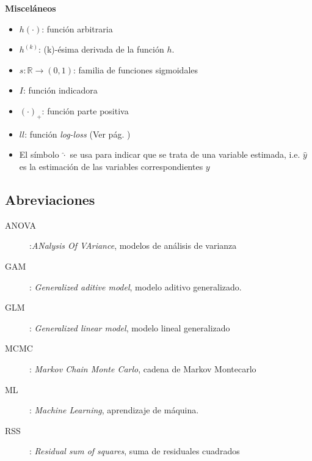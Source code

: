 \documentclass[../../Main/Main.tex]{subfiles}
\begin{document}
\textbf{Misceláneos}
\begin{itemize}[label={}]
	\item $h(\cdot)$: función arbitraria
	\item $h^{(k)}$: (k)-ésima derivada de la función $h$.
	\item $s: \mathbb{R} \rightarrow (0,1)$: familia de funciones sigmoidales
	\item $I$: función indicadora
	\item $(\cdot)_{+}$: función parte positiva
	\item $ll$: función \textit{log-loss} (Ver pág. \pageref{ec:LogLoss})
	\item El símbolo $\hat{\cdot}$ se usa para indicar que se trata de una variable estimada, i.e. $\hat{y}$ es la estimación de las variables correspondientes $y$
\end{itemize}

\subsection*{Abreviaciones}
\begin{description}
	\item[ANOVA]:\textit{ANalysis Of VAriance}, modelos de análisis de varianza
	\item[GAM]: \textit{Generalized aditive model}, modelo aditivo generalizado. 
	\item[GLM]: \textit{Generalized linear model}, modelo lineal generalizado
	\item[MCMC]: \textit{Markov Chain Monte Carlo}, cadena de Markov Montecarlo
	\item[ML]: \textit{Machine Learning}, aprendizaje de máquina.
	\item[RSS]: \textit{Residual sum of squares}, suma de residuales cuadrados
\end{description}
\end{document}
